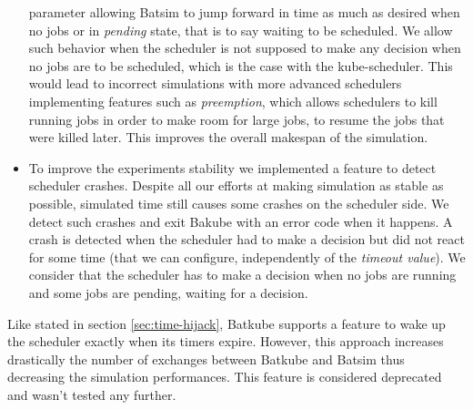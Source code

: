 \begin{itemize}[leftmargin=*]
		parameter allowing Batsim to jump forward in time as much as
		desired when no jobs or in \textit{pending} state, that is to
		say waiting to be scheduled. We allow such behavior when the
		scheduler is not supposed to make any decision when no jobs are
		to be scheduled, which is the case with the kube-scheduler.
		This would lead to incorrect simulations with more advanced
		schedulers implementing features such as \textit{preemption},
		which allows schedulers to kill running jobs in order to make
		room for large jobs, to resume the jobs that were killed later.
		This improves the overall makespan of the simulation.
	\item To improve the experiments stability we implemented a feature to
		detect scheduler crashes. Despite all our efforts at making
		simulation as stable as possible, simulated time still causes
		some crashes on the scheduler side. We detect such crashes and
		exit Bakube with an error code when it happens. A crash is
		detected when the scheduler had to make a decision but did not
		react for some time (that we can configure, independently of
		the \textit{timeout value}). We consider that the scheduler has
		to make a decision when no jobs are running and some jobs are
		pending, waiting for a decision.
\end{itemize}

Like stated in section \ref{sec:time-hijack}, Batkube supports a feature to
wake up the scheduler exactly when its timers expire. However, this approach
increases drastically the number of exchanges between Batkube and Batsim thus
decreasing the simulation performances. This feature is considered deprecated
and wasn't tested any further.
